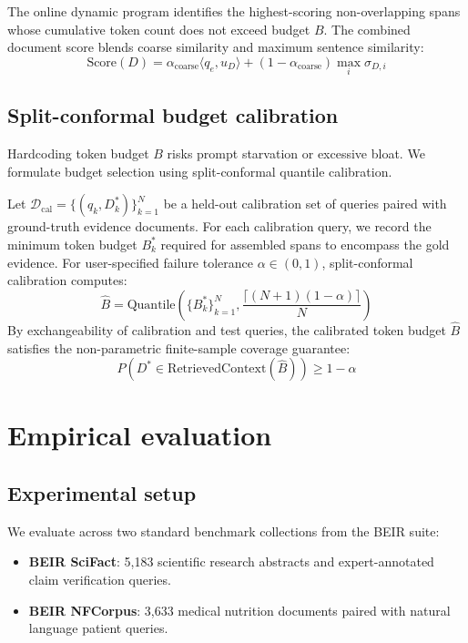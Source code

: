 \documentclass[preprint,12pt]{article}
\begin{document}
The online dynamic program identifies the highest-scoring non-overlapping spans whose cumulative token count does not exceed budget $B$. The combined document score blends coarse similarity and maximum sentence similarity:
\begin{equation}
\text{Score}(D) = \alpha_{\text{coarse}} \langle q_e, u_D \rangle + (1 - \alpha_{\text{coarse}}) \max_i \sigma_{D, i}
\end{equation}

\subsection{Split-conformal budget calibration}
Hardcoding token budget $B$ risks prompt starvation or excessive bloat. We formulate budget selection using split-conformal quantile calibration.

Let $\mathcal{D}_{\text{cal}} = \{(q_k, D_k^*)\}_{k=1}^N$ be a held-out calibration set of queries paired with ground-truth evidence documents. For each calibration query, we record the minimum token budget $B_k^*$ required for assembled spans to encompass the gold evidence. For user-specified failure tolerance $\alpha \in (0, 1)$, split-conformal calibration computes:
\begin{equation}
\hat{B} = \text{Quantile}\left( \{B_k^*\}_{k=1}^N, \frac{\lceil (N + 1)(1 - \alpha) \rceil}{N} \right)
\end{equation}
By exchangeability of calibration and test queries, the calibrated token budget $\hat{B}$ satisfies the non-parametric finite-sample coverage guarantee:
\begin{equation}
P(D^* \in \text{RetrievedContext}(\hat{B})) \ge 1 - \alpha
\end{equation}

\section{Empirical evaluation}

\subsection{Experimental setup}
We evaluate across two standard benchmark collections from the BEIR suite:
\begin{itemize}
    \item \textbf{BEIR SciFact}: 5,183 scientific research abstracts and expert-annotated claim verification queries.
    \item \textbf{BEIR NFCorpus}: 3,633 medical nutrition documents paired with natural language patient queries.
\end{itemize}
\end{document}
